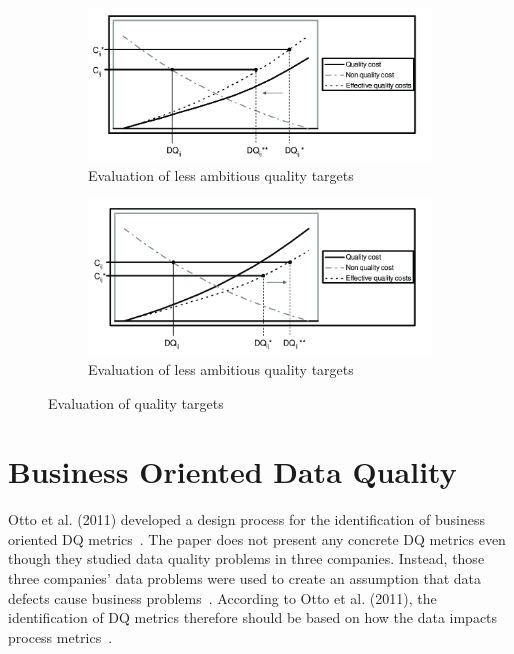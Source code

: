 \begin{figure}[htb]
    \centering
    
    \begin{subfigure}{0.45\textwidth}
        \includegraphics[width=\textwidth]{figures/cdqm-less-q.png}
        \centering
        \caption{Evaluation of less ambitious quality targets}
        \label{fig:cdqm-less-q}
    \end{subfigure}
    \begin{subfigure}{0.45\textwidth}
        \includegraphics[width=\textwidth]{figures/cdqm-more-q.png}
        \centering
        \caption{Evaluation of less ambitious quality targets}
        \label{fig:cdqm-more-q}
    \end{subfigure}

    \caption{Evaluation of quality targets~\cite{batini2008}}
    \label{fig:cdqm-q}
\end{figure}
\FloatBarrier

\section{Business Oriented Data Quality}

Otto et al. (2011) developed a design process for the identification of business oriented DQ metrics~\cite{otto2011}.
The paper does not present any concrete DQ metrics even though they studied data quality problems in three companies.
Instead, those three companies' data problems were used to create an assumption that data defects cause business problems~\cite{otto2011}.
According to Otto et al. (2011), the identification of DQ metrics therefore should be based on how the data impacts process metrics~\cite{otto2011}.

